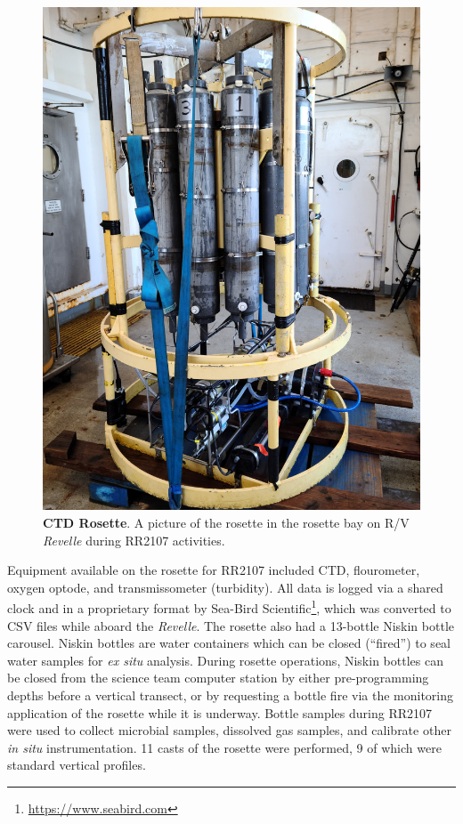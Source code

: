 \begin{figure}[h!]
  \centering
  \includegraphics[width=0.8\columnwidth]{figures/ops_rosette.jpg}
  \caption[CTD Rosette]{\textbf{CTD Rosette}. A picture of the rosette in the rosette bay on R/V \emph{Revelle} during RR2107 activities.}
  \label{fig:ops_rosette}
\end{figure}


Equipment available on the rosette for RR2107 included CTD, flourometer, oxygen optode, and transmissometer (turbidity). All data is logged via a shared clock and in a proprietary format by Sea-Bird Scientific\footnote{\url{https://www.seabird.com}}, which was converted to CSV files while aboard the \emph{Revelle}. The rosette also had a 13-bottle Niskin bottle carousel. Niskin bottles are water containers which can be closed (``fired'') to seal water samples for \emph{ex situ} analysis. During rosette operations, Niskin bottles can be closed from the science team computer station by either pre-programming depths before a vertical transect, or by requesting a bottle fire via the monitoring application of the rosette while it is underway. Bottle samples during RR2107 were used to collect microbial samples, dissolved gas samples, and calibrate other \emph{in situ} instrumentation. 11 casts of the rosette were performed, 9 of which were standard vertical profiles. 

